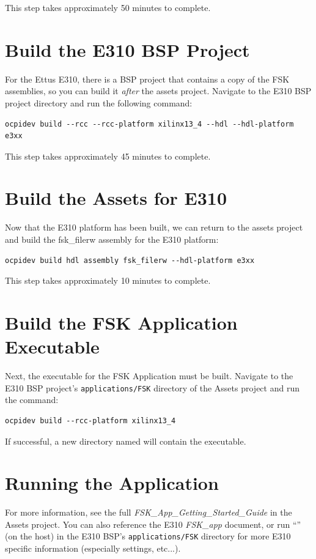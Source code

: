 \begin{flushleft}
This step takes approximately 50 minutes to complete.

\section{Build the E310 BSP Project}
For the Ettus E310, there is a BSP project that contains a copy of the FSK assemblies, so you can build it \textit{after} the assets project. Navigate to the E310 BSP project directory and run the following command:
\begin{verbatim}
ocpidev build --rcc --rcc-platform xilinx13_4 --hdl --hdl-platform e3xx
\end{verbatim}
This step takes approximately 45 minutes to complete.

\section{Build the Assets for E310}
Now that the E310 platform has been built, we can return to the assets project and build the fsk\_filerw assembly for the E310 platform:
\begin{verbatim}
ocpidev build hdl assembly fsk_filerw --hdl-platform e3xx
\end{verbatim}
This step takes approximately 10 minutes to complete.


\section{Build the FSK Application Executable}
Next, the executable for the FSK Application must be built. Navigate to the E310 BSP project's \texttt{applications/FSK} directory of the Assets project and run the command:
\begin{verbatim}
ocpidev build --rcc-platform xilinx13_4
\end{verbatim}
	If successful, a new directory named  will contain the executable.

\section{Running the Application}
For more information, see the full \textit{FSK\_App\_Getting\_Started\_Guide} in the Assets project. You can also reference the E310 \textit{FSK\_app} document, or run ``'' (on the host) in the E310 BSP's \texttt{applications/FSK} directory for more E310 specific information (especially  settings, etc...).\\\medskip


\end{flushleft}
